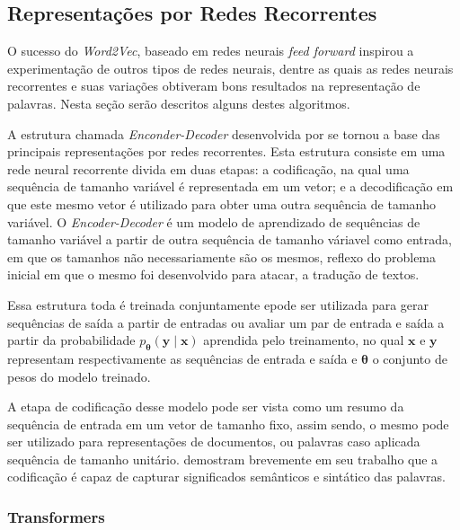 
\subsection{Representações por Redes Recorrentes}

O sucesso do \textit{Word2Vec}, baseado em redes neurais \textit{feed forward}
inspirou a experimentação de outros tipos de redes neurais, dentre as quais as
redes neurais recorrentes e suas variações obtiveram bons resultados na
representação de palavras.
Nesta seção serão descritos alguns destes algoritmos.

A estrutura chamada \textit{Enconder-Decoder} desenvolvida por \citet{cho14} se
tornou a base das principais representações por redes recorrentes.
Esta estrutura consiste em uma rede neural recorrente divida em duas etapas: a
codificação, na qual uma sequência de tamanho variável é representada em um
vetor; e a decodificação em que este mesmo vetor é utilizado para obter uma
outra sequência de tamanho variável.
O \textit{Encoder-Decoder} é um modelo de aprendizado de sequências de tamanho
variável a partir de outra sequência de tamanho váriavel como entrada, em que
os tamanhos não necessariamente são os mesmos, reflexo do problema inicial em
que o mesmo foi desenvolvido para atacar, a tradução de textos.


Essa estrutura toda é treinada conjuntamente epode ser utilizada para gerar
sequências de saída a partir de entradas ou avaliar um par de entrada e saída a
partir da probabilidade $p_{\mathbf{\theta}}(\mathbf{y} \mid \mathbf{x})$
aprendida pelo treinamento, no qual $\mathbf{x}$ e $\mathbf{y}$ representam
respectivamente as sequências de entrada e saída e $\mathbf{\theta}$ o conjunto
de pesos do modelo treinado.

A etapa de codificação desse modelo pode ser vista como um resumo da sequência
de entrada em um vetor de tamanho fixo, assim sendo, o mesmo pode ser utilizado
para representações de documentos, ou palavras caso aplicada sequência de
tamanho unitário.
\citet{cho14} demostram brevemente em seu trabalho que a codificação é capaz de
capturar significados semânticos e sintático das palavras.

\subsubsection{Transformers}

